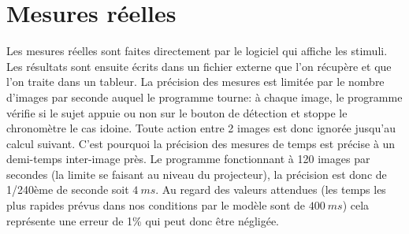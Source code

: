 	\section{Mesures réelles}
	\par Les mesures réelles sont faites directement par le logiciel qui affiche les stimuli. Les résultats sont ensuite écrits dans un fichier externe que l'on récupère et que l'on traite  dans un tableur. La précision des mesures est limitée par le nombre d'images par seconde auquel le programme tourne: à chaque image, le programme vérifie si le sujet appuie ou non sur le bouton de détection et stoppe le chronomètre le cas idoine. Toute action entre 2 images est donc ignorée jusqu'au calcul suivant. C'est pourquoi la précision des mesures de temps est précise à un demi-temps inter-image près. Le programme fonctionnant à 120 images par secondes (la limite se faisant au niveau du projecteur), la précision est donc de 1/240ème de seconde soit $4~ms$. Au regard des valeurs attendues (les temps les plus rapides prévus dans nos conditions par le modèle sont de $400~ms$) cela représente une erreur de 1\% qui peut donc être négligée.
	

